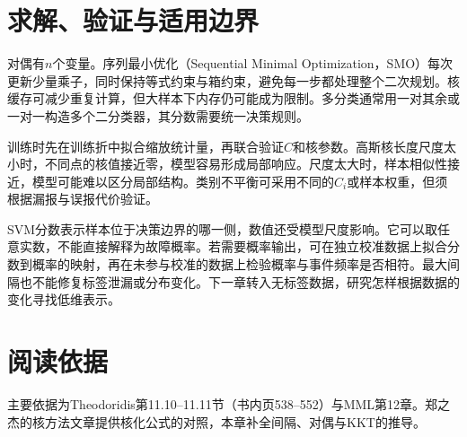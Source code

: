 \section{求解、验证与适用边界}
对偶有$n$个变量。序列最小优化（Sequential Minimal Optimization，SMO）每次更新少量乘子，同时保持等式约束与箱约束，避免每一步都处理整个二次规划。核缓存可减少重复计算，但大样本下内存仍可能成为限制。多分类通常用一对其余或一对一构造多个二分类器，其分数需要统一决策规则。

训练时先在训练折中拟合缩放统计量，再联合验证$C$和核参数。高斯核长度尺度太小时，不同点的核值接近零，模型容易形成局部响应。尺度太大时，样本相似性接近，模型可能难以区分局部结构。类别不平衡可采用不同的$C_i$或样本权重，但须根据漏报与误报代价验证。

SVM分数表示样本位于决策边界的哪一侧，数值还受模型尺度影响。它可以取任意实数，不能直接解释为故障概率。若需要概率输出，可在独立校准数据上拟合分数到概率的映射，再在未参与校准的数据上检验概率与事件频率是否相符。最大间隔也不能修复标签泄漏或分布变化。下一章转入无标签数据，研究怎样根据数据的变化寻找低维表示。

\section{阅读依据}
主要依据为Theodoridis第11.10--11.11节（书内页538--552）与MML第12章。郑之杰的核方法文章提供核化公式的对照\cite{zheng2021kernel}，本章补全间隔、对偶与KKT的推导。
